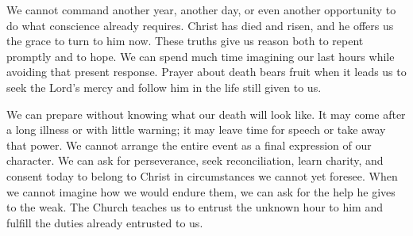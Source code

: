 We cannot command another year, another day, or even another opportunity to do what conscience already requires. Christ has died and risen, and he offers us the grace to turn to him now. These truths give us reason both to repent promptly and to hope. We can spend much time imagining our last hours while avoiding that present response. Prayer about death bears fruit when it leads us to seek the Lord's mercy and follow him in the life still given to us.

We can prepare without knowing what our death will look like. It may come after a long illness or with little warning; it may leave time for speech or take away that power. We cannot arrange the entire event as a final expression of our character. We can ask for perseverance, seek reconciliation, learn charity, and consent today to belong to Christ in circumstances we cannot yet foresee. When we cannot imagine how we would endure them, we can ask for the help he gives to the weak. The Church teaches us to entrust the unknown hour to him and fulfill the duties already entrusted to us.

